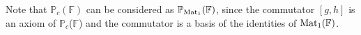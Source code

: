 \documentclass[12pt,reqno]{article}
\newcommand\F{\ensuremath{\mathbb F}}
\newcommand\PP{{\mathbb P}}
\newcommand\PC{\ensuremath{\PP_c}}
\newcommand{\matone}{{\ensuremath{{\rm Mat}_1(\F)}}}
\begin{document}
Note that $ \PC(\F)$ can be considered as ${\PP_{{\rm Mat}_1}(\F)}$, since the commutator $[g,h]$ is an axiom of  \PC(\F) and the commutator is a basis of the identities of \matone.

\medskip

\end{document}
